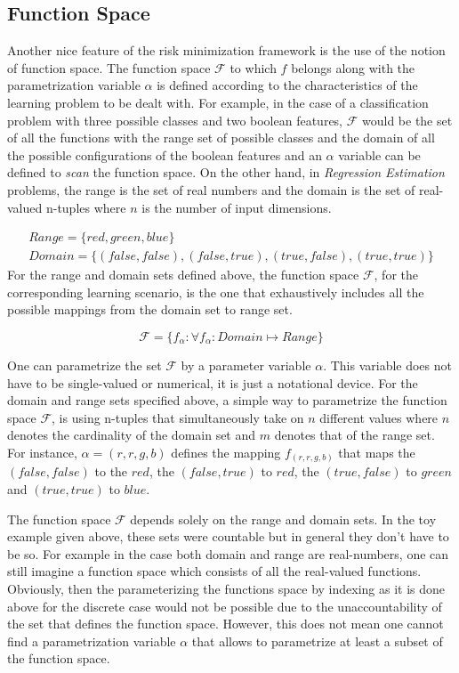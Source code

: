 {\subsection{Function Space}

Another nice feature of the risk minimization framework is the use of the notion of function space. The function space $\mathcal{F}$ to which $f$ belongs along with the parametrization variable $\alpha$ is defined according to the characteristics of the learning problem to be dealt with. For example, in the case of a classification problem with three possible classes and two boolean features, $\mathcal{F}$ would be the set of all the functions with the range set of possible classes and the domain of all the possible configurations of the boolean features and an $\alpha$ variable can be defined to \textit{scan} the function space. On the other hand, in \textit{Regression Estimation} problems, the range is the set of real numbers and the domain is the set of real-valued n-tuples where $n$ is the number of input dimensions.
\begin{ex}
\begin{align*}
&Range=\{red,green,blue\} & \\
&Domain=\{(false,false),(false,true),(true,false),(true,true)\}&
\end{align*}
For the range and domain sets defined above, the function space $\mathcal{F}$, for the corresponding learning scenario, is the one that exhaustively includes all the possible mappings from the domain set to range set.

$$\mathcal{F}=\{f_{\alpha} : \forall f_{\alpha} : Domain \mapsto Range\} $$

One can parametrize the set $\mathcal{F}$ by a parameter variable $\alpha$. This variable does not have to be single-valued or numerical, it is just a notational device. For the domain and range sets specified above, a simple way to parametrize the function space $\mathcal{F}$, is using n-tuples that simultaneously take on $n$ different values where $n$ denotes the cardinality of the domain set and $m$ denotes that of the range set. 
For instance, $\alpha = (r,r,g,b)$ defines the mapping $f_{(r,r,g,b)}$ that maps the $(false, false)$ to the $red$, the $(false,true)$ to $red$, the $(true, false)$ to $green$ and $(true,true)$ to $blue$.

\end{ex}

The function space $\mathcal{F}$ depends solely on the range and domain sets. In the toy example given above, these sets were countable but in general they don't have to be so. For example in the case both domain and range are real-numbers, one can still imagine a function space which consists of all the real-valued functions. Obviously, then the parameterizing the functions space by indexing as it is done above for the discrete case would not be possible due to the unaccountability of the set that defines the function space. However, this does not mean one cannot find a parametrization variable $\alpha$ that allows to parametrize at least a subset of the function space.

}
